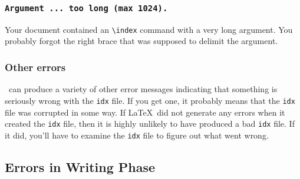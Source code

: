 %
%
%
%
%

\subsubsection*{\tt Argument ... too long (max 1024).}

Your document contained an \verb|\index| command with a very long
argument.  You probably forgot the right brace that was supposed
to delimit the argument.

\subsubsection*{Other errors}

\MakeIndex\ can produce a variety of other error messages indicating
that something is seriously wrong with the {\tt idx} file.  If you
get one, it probably means that the {\tt idx} file was corrupted in
some way.  If \LaTeX\ did not generate any errors when it created
the {\tt idx} file, then it is highly unlikely to have produced
a bad {\tt idx} file.  If it did, you'll have to examine the
{\tt idx} file to figure out what went wrong.


\subsection{Errors in Writing Phase}


